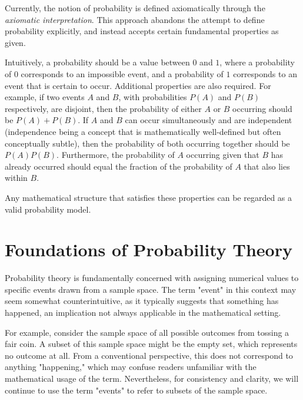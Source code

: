 Currently, the notion of probability is defined axiomatically through the \emph{axiomatic interpretation}. This approach abandons the attempt to define probability explicitly, and instead accepts certain fundamental properties as given.

Intuitively, a probability should be a value between $0$ and $1$, where a probability of $0$ corresponds to an impossible event, and a probability of $1$ corresponds to an event that is certain to occur. Additional properties are also required. For example, if two events $A$ and $B$, with probabilities $P\left(A\right)$ and $P\left(B\right)$ respectively, are disjoint, then the probability of either $A$ or $B$ occurring should be $P\left(A\right) + P\left(B\right)$. If $A$ and $B$ can occur simultaneously and are independent (independence being a concept that is mathematically well-defined but often conceptually subtle), then the probability of both occurring together should be $P\left(A\right) P\left(B\right)$. Furthermore, the probability of $A$ occurring given that $B$ has already occurred should equal the fraction of the probability of $A$ that also lies within $B$.

Any mathematical structure that satisfies these properties can be regarded as a valid probability model.

%
%

\section{Foundations of Probability Theory}
\label{sec:probability_foundations}

Probability theory is fundamentally concerned with assigning numerical values to specific events drawn from a sample space. The term "event" in this context may seem somewhat counterintuitive, as it typically suggests that something has happened, an implication not always applicable in the mathematical setting.

For example, consider the sample space of all possible outcomes from tossing a fair coin. A subset of this sample space might be the empty set, which represents no outcome at all. From a conventional perspective, this does not correspond to anything "happening," which may confuse readers unfamiliar with the mathematical usage of the term. Nevertheless, for consistency and clarity, we will continue to use the term "events" to refer to subsets of the sample space.

